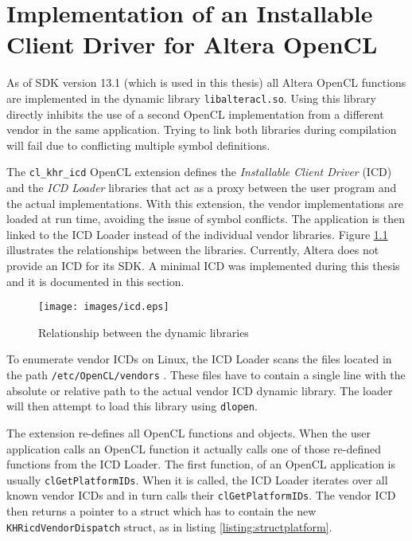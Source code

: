 
\chapter{Implementation of an Installable Client Driver for Altera OpenCL}
\label{section:icd}

As of SDK version 13.1 (which is used in this thesis) all Altera OpenCL functions are implemented in the dynamic library \texttt{libalteracl.so}.
Using this library directly inhibits the use of a second OpenCL implementation from a different vendor in the same application.
Trying to link both libraries during compilation will fail due to conflicting multiple symbol definitions.

The \texttt{cl\_khr\_icd} OpenCL extension \cite{icd} defines the \emph{Installable Client Driver} (ICD) and the \emph{ICD Loader} libraries that act as a proxy between the user program and the actual implementations.
With this extension, the vendor implementations are loaded at run time, avoiding the issue of symbol conflicts.
The application is then linked to the ICD Loader instead of the individual vendor libraries.
Figure \ref{fig:icd} illustrates the relationships between the libraries.
Currently, Altera does not provide an ICD for its SDK.
A minimal ICD was implemented during this thesis and it is documented in this section.


\begin{figure}[htb]
\centerline{
\texttt{[image: images/icd.eps]}}
\caption{Relationship between the dynamic libraries}
\label{fig:icd}
\end{figure}



To enumerate vendor ICDs on Linux, the ICD Loader scans the files located in the path \texttt{/etc/OpenCL/vendors} \cite{icd}.
These files have to contain a single line with the absolute or relative path to the actual vendor ICD dynamic library.
The loader will then attempt to load this library using \texttt{dlopen}.

The extension re-defines all OpenCL functions and objects.
When the user application calls an OpenCL function it actually calls one of those re-defined functions from the ICD Loader.
The first function, of an OpenCL application is usually \texttt{clGetPlatformIDs}.
When it is called, the ICD Loader iterates over all known vendor ICDs and in turn calls their \texttt{clGetPlatformIDs}.
The vendor ICD then returns a pointer to a struct which has to contain the new \texttt{KHRicdVendorDispatch} struct, as in listing \ref{listing:structplatform}.

